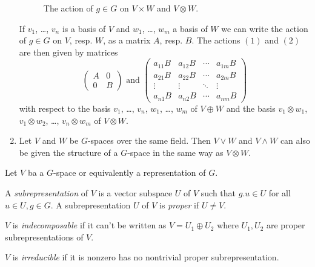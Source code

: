 \begin{expls}
\begin{enumerate}[label=\emph{\alph*)},leftmargin=*]
      \begin{figure}\label{fig: action on product and tensor}\centering
        \caption{The action of $g \in G$ on $V \times W$ and $V \otimes W$.}
      \end{figure}
      If $v_1$, \dots, $v_n$ is a basis of $V$ and $w_1$, \dots, $w_m$ a basis of $W$ we can write the action of $g \in G$ on $V$, resp. $W$, as a matrix $A$, resp. $B$. The actions $(1)$ and $(2)$ are then given by matrices
      \[
        \begin{pmatrix}
          A & 0 \\
          0 & B
        \end{pmatrix}
        \text{ and }
        \begin{pmatrix}
          a_{11} B & a_{12} B & \cdots & a_{1m} B \\
          a_{21} B & a_{22} B & \cdots & a_{2m} B \\
            \vdots  &  \vdots  & \ddots &  \vdots  \\
          a_{n1} B & a_{n2} B & \cdots & a_{nm} B
        \end{pmatrix}
      \]
      with respect to the basis $v_1$, \dots, $v_n$, $w_1$, \dots, $w_m$ of $V \oplus W$ and the basis $v_1 \otimes w_1$, $v_1 \otimes w_2$, \dots, $v_n \otimes w_m$ of $V \otimes W$.
    \item
      Let $V$ and $W$ be $G$-spaces over the same field. Then $V \vee W$ and $V \wedge W$ can also be given the structure of a $G$-space in the same way as $V \otimes W$.
  \end{enumerate}
\end{expls}


\begin{defi}
    Let $V$ ba a $G$-space or equivalently a representation of $G$.

    A \emph{subrepresentation} of $V$ is a vector subspace $U$ of $V$ such that $g.u \in U$ for all $u \in U, g \in G$. A subrepresentation $U$ of $V$ is \emph{proper} if $U \neq V$.
    
    $V$ is \emph{indecomposable} if it can’t be written as $V = U_1 \oplus U_2$ where $U_1, U_2$ are proper subrepresentations of $V$.
    
    $V$ is \emph{irreducible} if it is nonzero has no nontrivial proper subrepresentation.
\end{defi}

